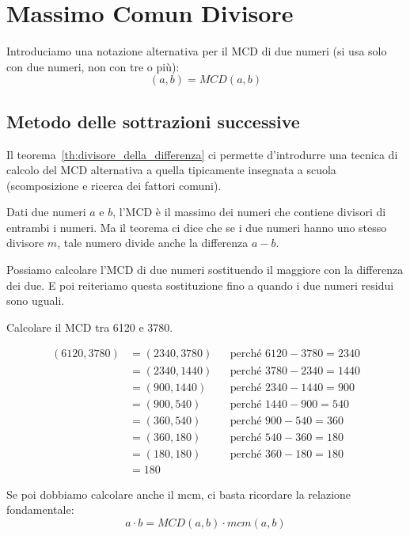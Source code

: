 \chapter{Massimo Comun Divisore}
\label{ch:mcd}

Introduciamo una notazione alternativa per il MCD di due numeri (si usa solo con due numeri, non con tre o più):
\begin{equation*}
    (a, b) = MCD(a, b)
\end{equation*}

\section{Metodo delle sottrazioni successive}
\label{sec:metodo_sottrazioni_successive}

Il teorema~\ref{th:divisore_della_differenza} ci permette d'introdurre una tecnica di calcolo del MCD alternativa a quella tipicamente insegnata a scuola (scomposizione e ricerca dei fattori comuni).

Dati due numeri $a$ e $b$, l'MCD è il massimo dei numeri che contiene divisori di entrambi i numeri.
Ma il teorema ci dice che se i due numeri hanno uno stesso divisore $m$, tale numero divide anche la differenza $a - b$.

\begin{definizione}

Possiamo calcolare l'MCD di due numeri sostituendo il maggiore con la differenza dei due.
E poi reiteriamo questa sostituzione fino a quando i due numeri residui sono uguali.

\end{definizione}

\begin{esercizio}
    Calcolare il MCD tra 6120 e 3780.

    \begin{align*}
        (6120, 3780) &= (2340, 3780) &&\text{perché } 6120 - 3780 = 2340 \\
        &= (2340, 1440) &&\text{perché } 3780 - 2340 = 1440 \\
        &= (900, 1440) &&\text{perché } 2340 - 1440 = 900 \\
        &= (900, 540) &&\text{perché } 1440 - 900 = 540 \\
        &= (360, 540) &&\text{perché } 900 - 540 = 360 \\
        &= (360, 180) &&\text{perché } 540 - 360 = 180 \\
        &= (180, 180) &&\text{perché } 360 - 180 = 180 \\
        &= 180
    \end{align*}
\end{esercizio}

Se poi dobbiamo calcolare anche il mcm, ci basta ricordare la relazione fondamentale:
\begin{equation*}
    a \cdot b = MCD(a, b) \cdot mcm(a, b)
\end{equation*}

